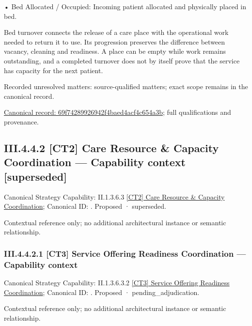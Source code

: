 •
Bed Allocated / Occupied: Incoming patient allocated and physically placed in bed.



Bed turnover connects the release of a care place with the operational work needed to return it to use. Its progression preserves the difference between vacancy, cleaning and readiness. A place can be empty while work remains outstanding, and a completed turnover does not by itself prove that the service has capacity for the next patient.


{\small Recorded unresolved matters: source-qualified matters; exact scope remains in the canonical record.}\par
{\footnotesize \href{../../../../continuum/business/business-process/69f74289926942f4baed4acf4c654a3b.md}{Canonical record: 69f74289926942f4baed4acf4c654a3b}; full qualifications and provenance.}\par
\subsection*{III.4.4.2 [CT2] Care Resource \& Capacity Coordination — Capability context [superseded]}
\label{navigation:III.4.4.2}

{\small Canonical Strategy Capability: II.1.3.6.3 \hyperref[element:96f71cb8fa6844d7aa7e9f16759a3a62]{[CT2] Care Resource \& Capacity Coordination}; Canonical ID: \texttt{}. Proposed · superseded.}\par
Contextual reference only; no additional architectural instance or semantic relationship.\par
\subsubsection*{III.4.4.2.1 [CT3] Service Offering Readiness Coordination — Capability context}
\label{navigation:III.4.4.2.1}

{\small Canonical Strategy Capability: II.1.3.6.3.2 \hyperref[element:0caecaba5d3e4781b8671b12c13ee283]{[CT3] Service Offering Readiness Coordination}; Canonical ID: \texttt{}. Proposed · pending\_adjudication.}\par
Contextual reference only; no additional architectural instance or semantic relationship.\par
